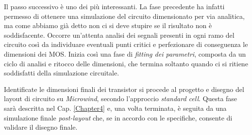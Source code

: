 Il passo successivo è uno dei più interessanti. La fase precedente ha infatti permesso di ottenere una simulazione del circuito dimensionato per via analitica, ma come abbiamo già detto non ci si deve stupire se il risultato non è soddisfacente. Occorre un'attenta analisi dei segnali presenti in ogni ramo del circuito così da individuare eventuali punti critici e perfezionare di conseguenza le dimensioni dei MOS. Inizia così una fase di \textit{fitting dei parametri}, composta da un ciclo di analisi e ritocco delle dimensioni, che termina soltanto quando ci si ritiene soddisfatti della simulazione circuitale. 

Identificate le dimensioni finali dei transistor si procede al progetto e disegno del layout di circuito su \textit{Microwind}, secondo l'approccio \textit{standard cell}. Questa fase sarà descritta nel Cap. \ref{Chapter4} e, una volta terminata, è seguita da una simulazione finale \textit{post-layout} che, se in accordo con le specifiche, consente di validare il disegno finale. 








